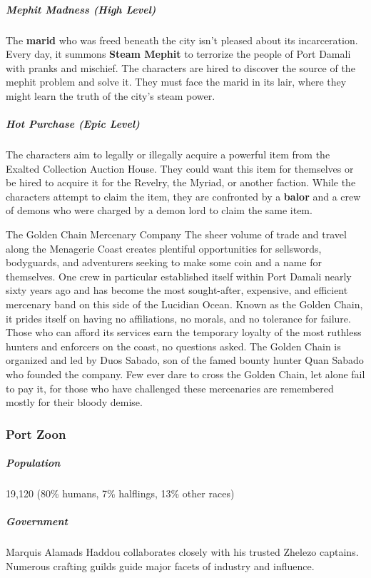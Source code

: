 \documentclass[10pt,a4paper,twoside,bg=print,twocolumn,openany,nodeprecatedcode]{dndbook}
\begin{document}
\subparagraph{Mephit Madness (High Level)}
The \textbf{marid} who was freed beneath the city isn't pleased about its incarceration. Every day, it summons \textbf{Steam Mephit} to terrorize the people of Port Damali with pranks and mischief. The characters are hired to discover the source of the mephit problem and solve it. They must face the marid in its lair, where they might learn the truth of the city's steam power.

\subparagraph{Hot Purchase (Epic Level)}
The characters aim to legally or illegally acquire a powerful item from the Exalted Collection Auction House. They could want this item for themselves or be hired to acquire it for the Revelry, the Myriad, or another faction. While the characters attempt to claim the item, they are confronted by a \textbf{balor} and a crew of demons who were charged by a demon lord to claim the same item.

\begin{DndSidebar}[float=!b]{The Golden Chain Mercenary Company}
The sheer volume of trade and travel along the Menagerie Coast creates plentiful opportunities for sellswords, bodyguards, and adventurers seeking to make some coin and a name for themselves. One crew in particular established itself within Port Damali nearly sixty years ago and has become the most sought-after, expensive, and efficient mercenary band on this side of the Lucidian Ocean. Known as the Golden Chain, it prides itself on having no affiliations, no morals, and no tolerance for failure. Those who can afford its services earn the temporary loyalty of the most ruthless hunters and enforcers on the coast, no questions asked. The Golden Chain is organized and led by Duos Sabado, son of the famed bounty hunter Quan Sabado who founded the company. Few ever dare to cross the Golden Chain, let alone fail to pay it, for those who have challenged these mercenaries are remembered mostly for their bloody demise.



\end{DndSidebar}

\subsubsection{Port Zoon}
\subparagraph{Population}
19,120 (80\% humans, 7\% halflings, 13\% other races)

\subparagraph{Government}
Marquis Alamads Haddou collaborates closely with his trusted Zhelezo captains. Numerous crafting guilds guide major facets of industry and influence.
\end{document}
